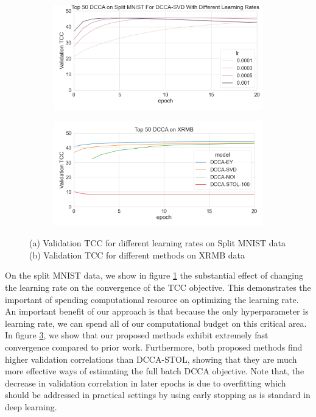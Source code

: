 \begin{figure}
     \centering
     \begin{subfigure}[b]{0.49\textwidth}
         \centering
         \includegraphics[width=\textwidth]{figures/deep_learning/DCCA/dcca_lr_experiment.png}
         \caption{}
         \label{fig:lrexp}
     \end{subfigure}
     \hfill
     \begin{subfigure}[b]{0.49\textwidth}
         \centering
         \includegraphics[width=\textwidth]{figures/deep_learning/DCCA/dcca_XRMB.png}
         \caption{}
                 \label{fig:xrmb}
     \end{subfigure}
        \caption{ (a) Validation TCC for different learning rates on Split MNIST data (b) Validation TCC for different methods on XRMB data}

\end{figure}

On the split MNIST data, we show in figure \ref{fig:lrexp} the substantial effect of changing the learning rate on the convergence of the TCC objective. This demonstrates the important of spending computational resource on optimizing the learning rate. An important benefit of our approach is that because the only hyperparameter is learning rate, we can spend all of our computational budget on this critical area. In figure \ref{fig:xrmb}, we show that our proposed methods exhibit extremely fast convergence compared to prior work. Furthermore, both proposed methods find higher validation correlations than DCCA-STOL, showing that they are much more effective ways of estimating the full batch DCCA objective. Note that, the decrease in validation correlation in later epochs is due to overfitting which should be addressed in practical settings by using early stopping as is standard in deep learning.


